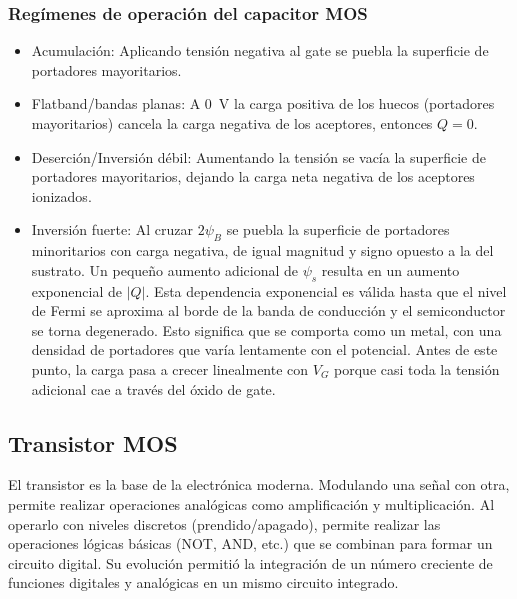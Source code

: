 \subsubsection{Regímenes de operación del capacitor MOS}
\begin{itemize}
    \item Acumulación:
        Aplicando tensión negativa al gate
        se puebla la superficie de portadores mayoritarios.
    \item Flatband/bandas planas: 
        A \SI{0}{\volt} la carga positiva de los huecos 
        (portadores mayoritarios)
        cancela la carga negativa de los aceptores, 
        entonces $Q=0$. 
    \item Deserción/Inversión débil:
        Aumentando la tensión se vacía la superficie de portadores
        mayoritarios,
        dejando la carga neta negativa de los aceptores ionizados.
    \item Inversión fuerte:
        Al cruzar $2\psi_B$ se puebla la superficie de portadores minoritarios
        con carga negativa,
        de igual magnitud y signo opuesto a la del sustrato.
        Un pequeño aumento adicional de $\psi_s$ resulta en un aumento exponencial
        de $|Q|$.
        Esta dependencia exponencial es válida hasta que el nivel de Fermi 
        se aproxima al borde de la banda de conducción y 
        el semiconductor se torna degenerado.
        Esto significa que se comporta como un metal,
        con una densidad de portadores que varía lentamente con el potencial.
        Antes de este punto, la carga pasa a crecer linealmente con $V_G$
        porque casi toda la tensión adicional cae a través del óxido de gate.
\end{itemize}
%
%
\subsection{Transistor MOS}
El transistor es la base de la electrónica moderna.
Modulando una señal con otra, 
permite realizar operaciones analógicas como amplificación y multiplicación.
Al operarlo con niveles discretos (prendido/apagado),
permite realizar las operaciones lógicas básicas (NOT, AND, etc.) que
se combinan para formar un circuito digital.
Su evolución permitió la integración de un número creciente de funciones
digitales y analógicas en un mismo circuito integrado.
%
